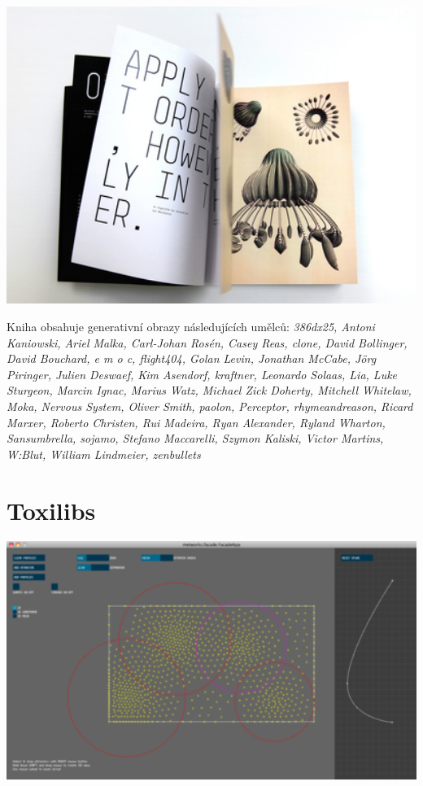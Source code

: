 \documentclass[10pt]{book}
\newcommand{\oddil}[1]{\section{#1}\index{#1}\label{#1}}
\begin{document}
\begin{centering}
\includegraphics[width = 1\textwidth]{imgs/writtenimages.png}
\end{centering}

Kniha obsahuje generativní obrazy následujících umělců:
{\em 
386dx25, Antoni Kaniowski, Ariel Malka, Carl-Johan Rosén, Casey Reas, clone, David Bollinger, David Bouchard, e m o c, flight404, Golan Levin, Jonathan McCabe, Jörg Piringer, Julien Deswaef, Kim Asendorf, kraftner, Leonardo Solaas, Lia, Luke Sturgeon, Marcin Ignac, Marius Watz, Michael Zick Doherty, Mitchell Whitelaw, Moka, Nervous System, Oliver Smith, paolon, Perceptor, rhymeandreason, Ricard Marxer, Roberto Christen, Rui Madeira, Ryan Alexander, Ryland Wharton, Sansumbrella, sojamo, Stefano Maccarelli, Szymon Kaliski, Victor Martins, W:Blut, William Lindmeier, zenbullets} 




\newpage
\oddil{Toxilibs}


\begin{center}
\includegraphics[width = 1\textwidth]{imgs/facade-1.png}
\end{center}
\end{document}
